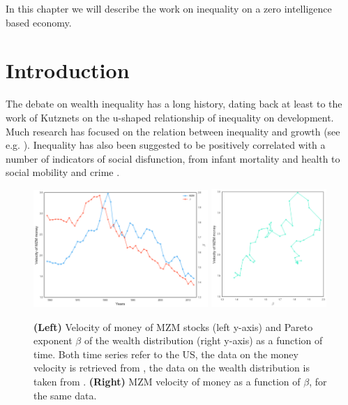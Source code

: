 In this chapter we will describe the work on inequality on a zero intelligence based economy.



\section{Introduction}

The debate on wealth inequality has a long history, dating back at least to the work of Kutznets \cite{Kuznets1955} on the u-shaped relationship of inequality on development. Much research has focused on the relation between inequality and growth (see e.g. \cite{PerssonTabellini1994}). Inequality has also been suggested to be positively correlated with a number of indicators of social disfunction, from infant mortality and health to social mobility and crime \cite{TheSpirit}.

\begin{figure}%
\centering
\includegraphics[width=0.59\textwidth]{figs_ineq/data_1.png}
\includegraphics[width=0.39\textwidth]{figs_ineq/data_2.png}
\caption{\textbf{(Left)} Velocity of money of MZM stocks (left y-axis) and Pareto exponent $\beta$ of the wealth distribution (right y-axis) as a function of time. Both time series refer to the US, the data on the money velocity is retrieved from \cite{FRED}, the data on the wealth distribution is taken from \cite{SaezZucman2016}. \textbf{(Right)} MZM velocity of money as a function of $\beta$, for the same data.} 
\label{Fig:data}
\end{figure}

